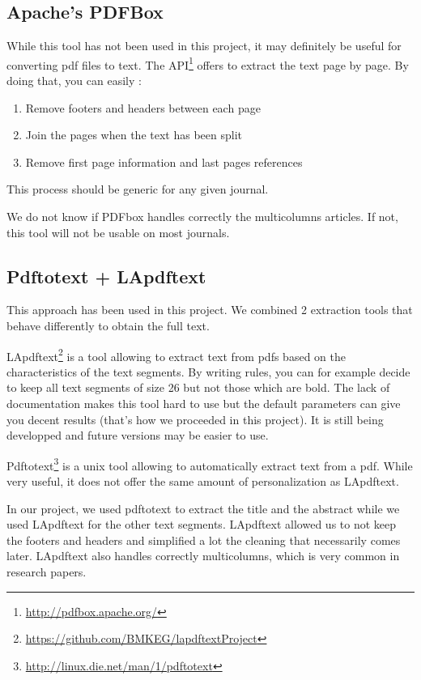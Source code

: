\documentclass[a4paper,10pt]{article}
\begin{document}
\subsection{Apache's PDFBox}
\label{sec:apachepdf}

While this tool has not been used in this project, it may definitely
be useful for converting pdf files to text. The
API\footnote{\url{http://pdfbox.apache.org/}} offers to extract the
text page by page. By doing that, you can easily :

\begin{enumerate}
\item Remove footers and headers between each page
\item Join the pages when the text has been split
\item Remove first page information and last pages references
\end{enumerate}

This process should be generic for any given journal.

We do not know if PDFbox handles correctly the multicolumns
articles. If not, this tool will not be usable on most journals.


\subsection{Pdftotext + LApdftext}
\label{sec:lapdf}

This approach has been used in this project. We combined 2 extraction
tools that behave differently to obtain the full text.

LApdftext\footnote{\url{https://github.com/BMKEG/lapdftextProject}} is
a tool allowing to extract text from pdfs based on the characteristics
of the text segments. By writing rules, you can for example decide to
keep all text segments of size 26 but not those which are bold. The
lack of documentation makes this tool hard to use but the default
parameters can give you decent results (that's how we proceeded in
this project). It is still being developped and future versions may be
easier to use.

Pdftotext\footnote{\url{http://linux.die.net/man/1/pdftotext}} is a
unix tool allowing to automatically extract text from a pdf. While
very useful, it does not offer the same amount of personalization as
LApdftext.

In our project, we used pdftotext to extract the title and the
abstract while we used LApdftext for the other text
segments. LApdftext allowed us to not keep the footers and headers and
simplified a lot the cleaning that necessarily comes later. LApdftext
also handles correctly multicolumns, which is very common in research
papers.
\end{document}
